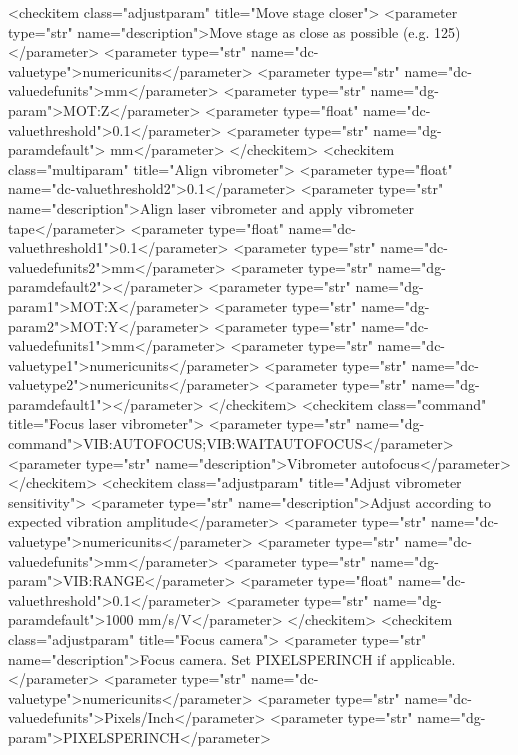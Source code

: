 \documentclass{QAstatement}
\begin{document}
{    <checkitem class="adjustparam" title="Move stage closer">
        <parameter type="str" name="description">Move stage as close as possible (e.g. 125)</parameter>
        <parameter type="str" name="dc-valuetype">numericunits</parameter>
        <parameter type="str" name="dc-valuedefunits">mm</parameter>
        <parameter type="str" name="dg-param">MOT:Z</parameter>
        <parameter type="float" name="dc-valuethreshold">0.1</parameter>
        <parameter type="str" name="dg-paramdefault"> mm</parameter>
    </checkitem>
    <checkitem class="multiparam" title="Align vibrometer">
        <parameter type="float" name="dc-valuethreshold2">0.1</parameter>
        <parameter type="str" name="description">Align laser vibrometer and
apply vibrometer tape</parameter>
        <parameter type="float" name="dc-valuethreshold1">0.1</parameter>
        <parameter type="str" name="dc-valuedefunits2">mm</parameter>
        <parameter type="str" name="dg-paramdefault2"></parameter>
        <parameter type="str" name="dg-param1">MOT:X</parameter>
        <parameter type="str" name="dg-param2">MOT:Y</parameter>
        <parameter type="str" name="dc-valuedefunits1">mm</parameter>
        <parameter type="str" name="dc-valuetype1">numericunits</parameter>
        <parameter type="str" name="dc-valuetype2">numericunits</parameter>
        <parameter type="str" name="dg-paramdefault1"></parameter>
    </checkitem>
    <checkitem class="command" title="Focus laser vibrometer">
        <parameter type="str" name="dg-command">VIB:AUTOFOCUS;VIB:WAITAUTOFOCUS</parameter>
        <parameter type="str" name="description">Vibrometer autofocus</parameter>
    </checkitem>
    <checkitem class="adjustparam" title="Adjust vibrometer sensitivity">
        <parameter type="str" name="description">Adjust according to expected vibration amplitude</parameter>
        <parameter type="str" name="dc-valuetype">numericunits</parameter>
        <parameter type="str" name="dc-valuedefunits">mm</parameter>
        <parameter type="str" name="dg-param">VIB:RANGE</parameter>
        <parameter type="float" name="dc-valuethreshold">0.1</parameter>
        <parameter type="str" name="dg-paramdefault">1000 mm/s/V</parameter>
    </checkitem>
    <checkitem class="adjustparam" title="Focus camera">
        <parameter type="str" name="description">Focus camera. Set PIXELSPERINCH if applicable.</parameter>
        <parameter type="str" name="dc-valuetype">numericunits</parameter>
        <parameter type="str" name="dc-valuedefunits">Pixels/Inch</parameter>
        <parameter type="str" name="dg-param">PIXELSPERINCH</parameter>
}
\end{document}
